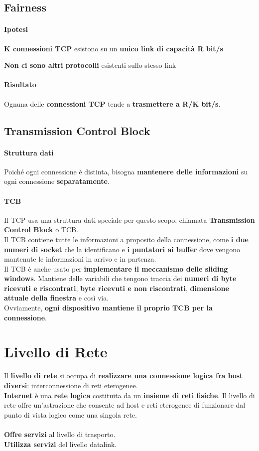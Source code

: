 \documentclass[10pt]{article}
\begin{document}
\subsection{Fairness}
\paragraph{Ipotesi} \begin{list}{}{}
\item \textbf{K connessioni TCP} esistono su un \textbf{unico link di capacità R bit/s}
\item \textbf{Non ci sono altri protocolli} esistenti sullo stesso link
\end{list}
\paragraph{Risultato} Ognuna delle \textbf{connessioni TCP} tende a \textbf{trasmettere a R/K bit/s}.
\subsection{Transmission Control Block}
\paragraph{Struttura dati} Poiché ogni connessione è distinta, bisogna \textbf{mantenere delle informazioni} su ogni connessione \textbf{separatamente}.
\paragraph{TCB} Il TCP usa una struttura dati speciale per questo scopo, chiamata \textbf{Transmission Control Block} o TCB.\\
Il TCB contiene tutte le informazioni a proposito della connessione, come \textbf{i due numeri di socket} che la identificano e \textbf{i puntatori ai buffer} dove vengono mantenute le informazioni in arrivo e in partenza.\\
Il TCB è anche usato per \textbf{implementare il meccanismo delle sliding windows}. Mantiene delle variabili che tengono traccia dei \textbf{numeri di byte ricevuti e riscontrati}, \textbf{byte ricevuti e non riscontrati}, \textbf{dimensione attuale della finestra} e così via.\\
Ovviamente, \textbf{ogni dispositivo mantiene il proprio TCB per la connessione}.
\pagebreak
\section{Livello di Rete}
Il \textbf{livello di rete} si occupa di \textbf{realizzare una connessione logica fra host diversi}: interconnessione di reti eterogenee.\\
\textbf{Internet} è una \textbf{rete logica} costituita da un \textbf{insieme di reti fisiche}. Il livello di rete offre un'astrazione che consente ad host e reti eterogenee di funzionare dal punto di vista logico come una singola rete.\\\\
\textbf{Offre servizi} al livello di trasporto.\\
\textbf{Utilizza servizi} del livello datalink.
\end{document}
